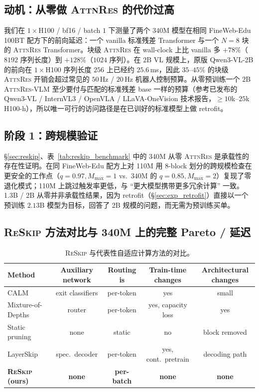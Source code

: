 \documentclass{article}
\newcommand{\attnres}{\textsc{AttnRes}}
\newcommand{\reskip}{\textsc{ReSkip}}
\begin{document}
\subsection{动机：从零做 \attnres{} 的代价过高}
\label{app:motivation}
我们在 $1{\times}$H100 / bf16 / batch $1$ 下测量了两个 $340$M 模型在相同 FineWeb-Edu 100BT 配方下的前向延迟：一个 vanilla 标准残差 Transformer 与一个 $N{=}8$ 块的 \attnres{} Transformer。块级 \attnres{} 在 wall-clock 上比 vanilla 多 $+78\%$（$8192$ 序列长度）到 $+128\%$（$1024$ 序列）。在 $2$B VL 规模上，原版 Qwen3-VL-2B 的前向在 $1{\times}$H100 序列长度 $256$ 上已经约 $25.6$\,ms，因此 $35$--$45\%$ 的块级 \attnres{} 开销会超过常见的 $50$\,Hz / $20$\,Hz 机器人控制预算。从零预训练一个 $2$B \attnres{}-VLM 至少要付与匹配的标准残差 base 一样的预算（参考已发布的 Qwen3-VL / InternVL3 / OpenVLA / LLaVA-OneVision 技术报告，$\geq 10$k--$25$k H100-h），所以唯一可行的访问路径是在已训好的标准模型上做 retrofit。

\subsection{阶段 1：跨规模验证}
\label{app:phase1}
\S\ref{sec:reskip}、表~\ref{tab:reskip_benchmark} 中的 340M 从零 \attnres{} 是承载性的存在性证明。在同 FineWeb-Edu 配方上对 110M 用 $8$-block 划分的跨规模检查在更安全的工作点（$q{=}0.97, M_{\max}{=}1$ vs.\ $340$M 的 $q{=}0.85, M_{\max}{=}2$）复现了零退化模式；110M 上跳过触发率更低，与 ``更大模型携带更多冗余计算'' 一致。1.3B / 2B 从零并非承载性结果，因为 retrofit（\S\ref{sec:exp_retrofit}）直接以一个预训练 $2.13$B 模型为目标，回答了 2B 规模的问题，而无需为预训练买单。

\subsection{\reskip{} 方法对比与 340M 上的完整 Pareto / 延迟}
\label{app:method_comparison}
\begin{table}[h]
\caption{\reskip{} 与代表性自适应计算方法的对比。}
\centering\small
\begin{tabular}{lcccc}
\toprule
Method & Auxiliary network & Routing is & Train-time changes & Architectural changes \\
\midrule
CALM~\citep{schuster2022confident} & exit classifiers & per-token & yes & small \\
Mixture-of-Depths~\citep{raposo2024mixture} & router & per-token & yes, capacity loss & yes \\
Static pruning~\citep{gromov2024unreasonable} & none & static & no & block removed \\
LayerSkip~\citep{elhoushi2024layerskip} & spec.\ decoder & per-token & yes, cont.\ pretrain & decoding path \\
\textbf{\reskip{} (ours)} & \textbf{none} & \textbf{per-batch} & \textbf{none} & \textbf{none} \\
\bottomrule
\end{tabular}
\end{table}
\end{document}
